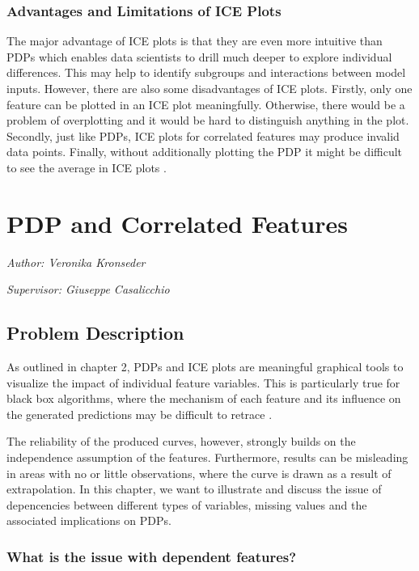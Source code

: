 \documentclass[]{krantz}
\begin{document}
\subsection{Advantages and Limitations of ICE
Plots}\label{advantages-and-limitations-of-ice-plots}

The major advantage of ICE plots is that they are even more intuitive
than PDPs which enables data scientists to drill much deeper to explore
individual differences. This may help to identify subgroups and
interactions between model inputs. However, there are also some
disadvantages of ICE plots. Firstly, only one feature can be plotted in
an ICE plot meaningfully. Otherwise, there would be a problem of
overplotting and it would be hard to distinguish anything in the plot.
Secondly, just like PDPs, ICE plots for correlated features may produce
invalid data points. Finally, without additionally plotting the PDP it
might be difficult to see the average in ICE plots \citep{molnar2019}.

\chapter{PDP and Correlated Features}\label{pdp-correlated}

\emph{Author: Veronika Kronseder}

\emph{Supervisor: Giuseppe Casalicchio}

\section{Problem Description}\label{ProblemDescription}

As outlined in chapter 2, PDPs and ICE plots are meaningful graphical
tools to visualize the impact of individual feature variables. This is
particularly true for black box algorithms, where the mechanism of each
feature and its influence on the generated predictions may be difficult
to retrace \citep{Goldstein2013}.

The reliability of the produced curves, however, strongly builds on the
independence assumption of the features. Furthermore, results can be
misleading in areas with no or little observations, where the curve is
drawn as a result of extrapolation. In this chapter, we want to
illustrate and discuss the issue of depencencies between different types
of variables, missing values and the associated implications on PDPs.

\subsection{What is the issue with dependent
features?}\label{what-is-the-issue-with-dependent-features}
\end{document}
